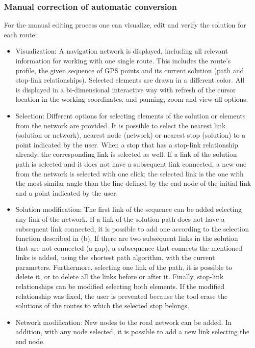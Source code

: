 \subsubsection{Manual correction of automatic conversion}

For the manual editing process one can visualize, edit and verify the solution for each route:
\begin{itemize}
	\item Visualization: A navigation network is displayed, including all  relevant information for working with one single route. This includes  the route’s profile, the given sequence of GPS points and its current  solution (path and stop-link relationships). Selected elements are drawn  in a different color. All is displayed in a bi-dimensional interactive  way with refresh of the cursor location in the working coordinates, and  panning,  zoom and view-all options.
	\item Selection: Different options for selecting elements of the solution  or elements from the network are provided. It is possible to select the  nearest link (solution or network), nearest node (network) or nearest  stop (solution) to a point indicated by the user. When a stop that has a  stop-link relationship already, the corresponding link is selected as  well. If a link of the solution path is selected and it does not have a  subsequent link connected, a new one from the network is selected with  one click; the selected link is the one with the most similar angle than  the line defined by the end node of the initial link and a point  indicated by the user.
	\item Solution modification: The first link of the sequence can be added  selecting any link of the network. If a link of the solution path does  not have a subsequent link connected, it is possible to add one  according to the selection function described in (b). If there are two  subsequent links in the solution that are not connected (a gap), a  subsequence that connects the mentioned links is added, using the  shortest path algorithm, with the current parameters. Furthermore,  selecting one link of the path, it is possible to delete it, or to  delete all the links before or after it. Finally, stop-link  relationships can be modified selecting both elements. If the modified  relationship was fixed, the user  is prevented because the tool erase  the solutions of the routes to which the selected stop belongs.
	\item Network modification: New nodes to the road network can be added. In  addition, with any node selected, it is possible to add a new link  selecting the end node.
\end{itemize}

